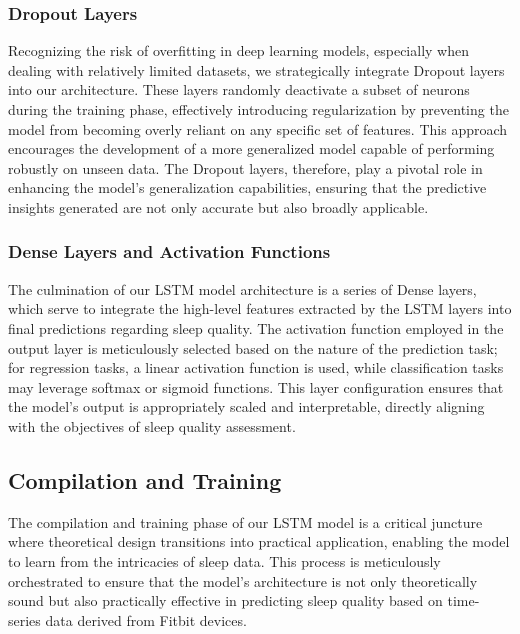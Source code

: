 \documentclass[10pt]{extarticle}
\begin{document}
\subsubsection{Dropout Layers}

Recognizing the risk of overfitting in deep learning models, especially when dealing with relatively limited datasets, we strategically integrate Dropout layers into our architecture. These layers randomly deactivate a subset of neurons during the training phase, effectively introducing regularization by preventing the model from becoming overly reliant on any specific set of features. This approach encourages the development of a more generalized model capable of performing robustly on unseen data. The Dropout layers, therefore, play a pivotal role in enhancing the model's generalization capabilities, ensuring that the predictive insights generated are not only accurate but also broadly applicable.

\subsubsection{Dense Layers and Activation Functions}

The culmination of our LSTM model architecture is a series of Dense layers, which serve to integrate the high-level features extracted by the LSTM layers into final predictions regarding sleep quality. The activation function employed in the output layer is meticulously selected based on the nature of the prediction task; for regression tasks, a linear activation function is used, while classification tasks may leverage softmax or sigmoid functions. This layer configuration ensures that the model's output is appropriately scaled and interpretable, directly aligning with the objectives of sleep quality assessment.

\subsection{Compilation and Training}

The compilation and training phase of our LSTM model is a critical juncture where theoretical design transitions into practical application, enabling the model to learn from the intricacies of sleep data. This process is meticulously orchestrated to ensure that the model's architecture is not only theoretically sound but also practically effective in predicting sleep quality based on time-series data derived from Fitbit devices.
\end{document}
